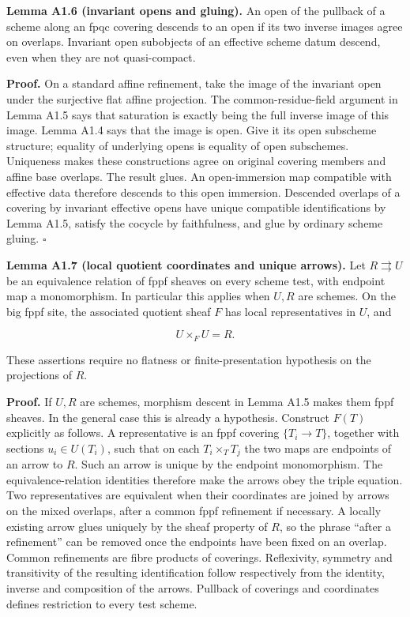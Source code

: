 \documentclass[11pt,a4paper,openany]{report}
\begin{document}
\textbf{Lemma A1.6 (invariant opens and gluing).} An open of the pullback of a scheme along an fpqc covering descends to an open if its two inverse images agree on overlaps. Invariant open subobjects of an effective scheme datum descend, even when they are not quasi-compact.

\textbf{Proof.} On a standard affine refinement, take the image of the invariant open under the surjective flat affine projection. The common-residue-field argument in Lemma A1.5 says that saturation is exactly being the full inverse image of this image. Lemma A1.4 says that the image is open. Give it its open subscheme structure; equality of underlying opens is equality of open subschemes. Uniqueness makes these constructions agree on original covering members and affine base overlaps. The result glues. An open-immersion map compatible with effective data therefore descends to this open immersion. Descended overlaps of a covering by invariant effective opens have unique compatible identifications by Lemma A1.5, satisfy the cocycle by faithfulness, and glue by ordinary scheme gluing. \(\square\)

\label{AG-RG-S04-quotient-local-coordinates} \textbf{Lemma A1.7 (local quotient coordinates and unique arrows).} Let \(R\rightrightarrows U\) be an equivalence relation of fppf sheaves on every scheme test, with endpoint map a monomorphism. In particular this applies when \(U,R\) are schemes. On the big fppf site, the associated quotient sheaf \(F\) has local representatives in \(U\), and

\[
U\times_F U=R.
\]

These assertions require no flatness or finite-presentation hypothesis on the projections of \(R\).

\textbf{Proof.} If \(U,R\) are schemes, morphism descent in Lemma A1.5 makes them fppf sheaves. In the general case this is already a hypothesis. Construct \(F(T)\) explicitly as follows. A representative is an fppf covering \(\{T_i\to T\}\), together with sections \(u_i\in U(T_i)\), such that on each \(T_i\times_TT_j\) the two maps are endpoints of an arrow to \(R\). Such an arrow is unique by the endpoint monomorphism. The equivalence-relation identities therefore make the arrows obey the triple equation. Two representatives are equivalent when their coordinates are joined by arrows on the mixed overlaps, after a common fppf refinement if necessary. A locally existing arrow glues uniquely by the sheaf property of \(R\), so the phrase ``after a refinement'' can be removed once the endpoints have been fixed on an overlap. Common refinements are fibre products of coverings. Reflexivity, symmetry and transitivity of the resulting identification follow respectively from the identity, inverse and composition of the arrows. Pullback of coverings and coordinates defines restriction to every test scheme.
\end{document}
